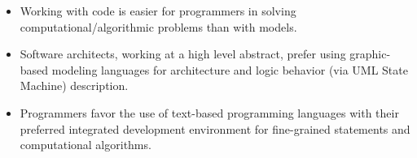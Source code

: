 








\vskip 0.03in
\noindent
{}
\begin{itemize}
	\item Working with code is easier for programmers in solving computational/algorithmic problems than with models.
	
	\item Software architects, working at a high level abstract, prefer using graphic-based modeling languages for architecture and logic behavior (via UML State Machine) description.
	
	\item Programmers favor the use of text-based programming languages with their preferred integrated development environment for fine-grained statements and computational algorithms.
\end{itemize}

